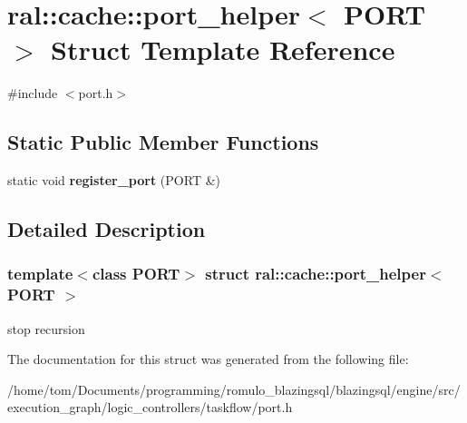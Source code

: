 \hypertarget{structral_1_1cache_1_1port__helper_3_01PORT_01_4}{}\section{ral\+:\+:cache\+:\+:port\+\_\+helper$<$ P\+O\+RT $>$ Struct Template Reference}
\label{structral_1_1cache_1_1port__helper_3_01PORT_01_4}


{\ttfamily \#include $<$port.\+h$>$}

\subsection*{Static Public Member Functions}
\begin{DoxyCompactItemize}
\item 
\mbox{\label{structral_1_1cache_1_1port__helper_3_01PORT_01_4_a582fb6f8699db2bdd1a2545b1a47bb2d}} 
static void {\bfseries register\+\_\+port} (P\+O\+RT \&)
\end{DoxyCompactItemize}


\subsection{Detailed Description}
\subsubsection*{template$<$class P\+O\+RT$>$\newline
struct ral\+::cache\+::port\+\_\+helper$<$ P\+O\+R\+T $>$}

stop recursion 

The documentation for this struct was generated from the following file\+:\begin{DoxyCompactItemize}
\item 
/home/tom/\+Documents/programming/romulo\+\_\+blazingsql/blazingsql/engine/src/execution\+\_\+graph/logic\+\_\+controllers/taskflow/port.\+h\end{DoxyCompactItemize}
